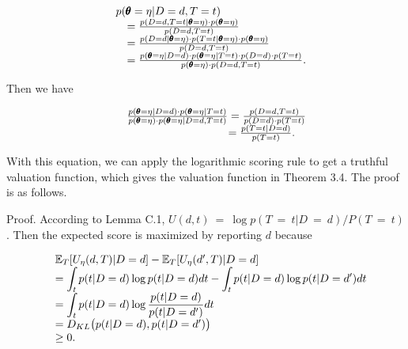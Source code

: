 \[
\begin{array} { r l } & { p ( \pmb \theta = \eta | D = d , T = t ) } \\ & { \quad = \frac { p \left( D = d , T = t | \pmb \theta = \eta \right) \cdot p \left( \pmb \theta = \eta \right) } { p \left( D = d , T = t \right) } } \\ & { \quad = \frac { p \left( D = d | \pmb \theta = \eta \right) \cdot p \left( T = t | \pmb \theta = \eta \right) \cdot p \left( \pmb \theta = \eta \right) } { p \left( D = d , T = t \right) } } \\ & { \quad = \frac { p \left( \pmb \theta = \eta | D = d \right) \cdot p \left( \pmb \theta = \eta | T = t \right) \cdot p \left( D = d \right) \cdot p \left( T = t \right) } { p \left( \pmb \theta = \eta \right) \cdot p \left( D = d , T = t \right) } . } \end{array}
\]

Then we have

\[
\begin{array} { r l r } & { } & { \frac { p ( \pmb \theta = \eta | D = d ) \cdot p ( \pmb \theta = \eta | T = t ) } { p ( \pmb \theta = \eta ) \cdot p ( \pmb \theta = \eta | D = d , T = t ) } = \frac { p ( D = d , T = t ) } { p ( D = d ) \cdot p ( T = t ) } } \\ & { } & { = \frac { p ( T = t | D = d ) } { p ( T = t ) } . \quad } \end{array}
\]

With this equation, we can apply the logarithmic scoring rule to get a
truthful valuation function, which gives the valuation function in
Theorem 3.4. The proof is as follows.

Proof. According to Lemma C.1,
\(U ( d , t ) ~ = ~ \log p ( T ~ = ~ t | D ~ = ~ d ) / P ( T ~ = ~ t )\)
. Then the expected score is maximized by reporting \(d\) because

\[
\begin{array} { r l } & { \mathbb { E } _ { T } [ U _ { \eta } ( d , T ) | D = d ] - \mathbb { E } _ { T } [ U _ { \eta } ( d ^ { \prime } , T ) | D = d ] } \\ & { = \displaystyle \int _ { t } p ( t | D = d ) \log p ( t | D = d ) d t - \displaystyle \int _ { t } p ( t | D = d ) \log p ( t | D = d ^ { \prime } ) d t } \\ & { = \displaystyle \int _ { t } p ( t | D = d ) \log \frac { p ( t | D = d ) } { p ( t | D = d ^ { \prime } ) } d t } \\ & { = D _ { K L } \big ( p ( t | D = d ) , p ( t | D = d ^ { \prime } ) \big ) } \\ & { \ge 0 . } \end{array}
\]

